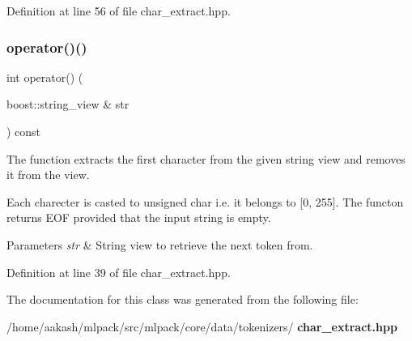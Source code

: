 Definition at line 56 of file char\+\_\+extract.\+hpp.

\mbox{\label{classmlpack_1_1data_1_1CharExtract_af8bc68c5ca75596657ff05e08954fbcd}} 
\subsubsection{operator()()}
{\footnotesize\ttfamily int operator() (\begin{DoxyParamCaption}\item[{boost\+::string\+\_\+view \&}]{str }\end{DoxyParamCaption}) const\hspace{0.3cm}{\ttfamily [inline]}}



The function extracts the first character from the given string view and removes it from the view. 

Each charecter is casted to unsigned char i.\+e. it belongs to [0, 255]. The functon returns E\+OF provided that the input string is empty.


\begin{DoxyParams}{Parameters}
{\em str} & String view to retrieve the next token from. \\
\hline
\end{DoxyParams}


Definition at line 39 of file char\+\_\+extract.\+hpp.



The documentation for this class was generated from the following file\+:\begin{DoxyCompactItemize}
\item 
/home/aakash/mlpack/src/mlpack/core/data/tokenizers/\textbf{ char\+\_\+extract.\+hpp}\end{DoxyCompactItemize}

